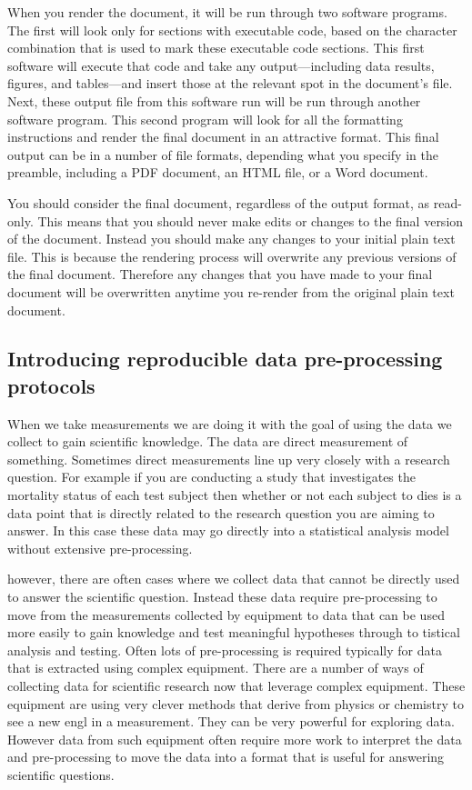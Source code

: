 \documentclass[]{tufte-book}
\begin{document}
When you render the document, it will be run through two software programs. The
first will look only for sections with executable code, based on the character
combination that is used to mark these executable code sections. This first
software will execute that code and take any output---including data results,
figures, and tables---and insert those at the relevant spot in the document's
file. Next, these output file from this software run will be run through another
software program. This second program will look for all the formatting
instructions and render the final document in an attractive format. This final
output can be in a number of file formats, depending what you specify in the
preamble, including a PDF document, an HTML file, or a Word document.

You should consider the final document, regardless of the output format, as
read-only. This means that you should never make edits or changes to the final
version of the document. Instead you should make any changes to your initial
plain text file. This is because the rendering process will overwrite any
previous versions of the final document. Therefore any changes that you have
made to your final document will be overwritten anytime you re-render from the
original plain text document.

\hypertarget{introducing-reproducible-data-pre-processing-protocols}{%
\subsection{Introducing reproducible data pre-processing protocols}\label{introducing-reproducible-data-pre-processing-protocols}}

When we take measurements we are doing it with the goal of using the data we collect to gain scientific knowledge. The data are direct measurement of something. Sometimes direct measurements line up very closely with a research question. For example if you are conducting a study that investigates the mortality status of each test subject then whether or not each subject to dies is a data point that is directly related to the research question you are aiming to answer. In this case these data may go directly into a statistical analysis model without extensive pre-processing.

however, there are often cases where we collect data that cannot be directly used to answer the scientific question. Instead these data require pre-processing to move from the measurements collected by equipment to data that can be used more easily to gain knowledge and test meaningful hypotheses through to tistical analysis and testing. Often lots of pre-processing is required typically for data that is extracted using complex equipment. There are a number of ways of collecting data for scientific research now that leverage complex equipment. These equipment are using very clever methods that derive from physics or chemistry to see a new engl in a measurement. They can be very powerful for exploring data. However data from such equipment often require more work to interpret the data and pre-processing to move the data into a format that is useful for answering scientific questions.
\end{document}
